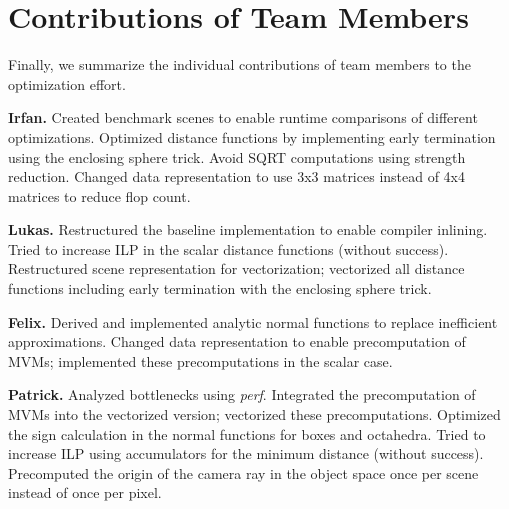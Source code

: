 \documentclass[letterpaper]{article}
\newcommand{\mypar}[1]{{\bf #1.}}
\begin{document}
\section{Contributions of Team Members}

Finally, we summarize the individual contributions of team members to the optimization effort.

\mypar{Irfan} Created benchmark scenes to enable runtime comparisons of different optimizations.
    Optimized distance functions by implementing early termination using the enclosing sphere trick.
    Avoid SQRT computations using strength reduction.
    Changed data representation to use 3x3 matrices instead of 4x4 matrices to reduce flop count.

\mypar{Lukas} Restructured the baseline implementation to enable compiler inlining. 
    Tried to increase ILP in the scalar distance functions (without success). 
    Restructured scene representation for vectorization; vectorized all distance functions including early termination with the enclosing sphere trick.

\mypar{Felix} Derived and implemented analytic normal functions to replace inefficient approximations.
    Changed data representation to enable precomputation of MVMs; implemented these precomputations in the scalar case.

\mypar{Patrick} Analyzed bottlenecks using \emph{perf}.
    Integrated the precomputation of MVMs into the vectorized version; vectorized these precomputations.
    Optimized the sign calculation in the normal functions for boxes and octahedra.
    Tried to increase ILP using accumulators for the minimum distance (without success).
    Precomputed the origin of the camera ray in the object space once per scene instead of once per pixel.



\end{document}
